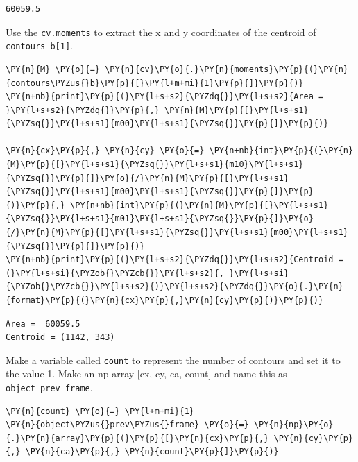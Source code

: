 \documentclass[a4paper,11pt]{article}%
\begin{document}
    \begin{Verbatim}[commandchars=\\\{\}]
60059.5
    \end{Verbatim}

    Use the \texttt{cv.moments} to extract the x and y coordinates of the
centroid of \texttt{contours\_b{[}1{]}}.

    \begin{tcolorbox}[breakable, size=fbox, boxrule=1pt, pad at break*=1mm,colback=cellbackground, colframe=cellborder]
\begin{Verbatim}[commandchars=\\\{\}]
\PY{n}{M} \PY{o}{=} \PY{n}{cv}\PY{o}{.}\PY{n}{moments}\PY{p}{(}\PY{n}{contours\PYZus{}b}\PY{p}{[}\PY{l+m+mi}{1}\PY{p}{]}\PY{p}{)}
\PY{n+nb}{print}\PY{p}{(}\PY{l+s+s2}{\PYZdq{}}\PY{l+s+s2}{Area = }\PY{l+s+s2}{\PYZdq{}}\PY{p}{,} \PY{n}{M}\PY{p}{[}\PY{l+s+s1}{\PYZsq{}}\PY{l+s+s1}{m00}\PY{l+s+s1}{\PYZsq{}}\PY{p}{]}\PY{p}{)}

\PY{n}{cx}\PY{p}{,} \PY{n}{cy} \PY{o}{=} \PY{n+nb}{int}\PY{p}{(}\PY{n}{M}\PY{p}{[}\PY{l+s+s1}{\PYZsq{}}\PY{l+s+s1}{m10}\PY{l+s+s1}{\PYZsq{}}\PY{p}{]}\PY{o}{/}\PY{n}{M}\PY{p}{[}\PY{l+s+s1}{\PYZsq{}}\PY{l+s+s1}{m00}\PY{l+s+s1}{\PYZsq{}}\PY{p}{]}\PY{p}{)}\PY{p}{,} \PY{n+nb}{int}\PY{p}{(}\PY{n}{M}\PY{p}{[}\PY{l+s+s1}{\PYZsq{}}\PY{l+s+s1}{m01}\PY{l+s+s1}{\PYZsq{}}\PY{p}{]}\PY{o}{/}\PY{n}{M}\PY{p}{[}\PY{l+s+s1}{\PYZsq{}}\PY{l+s+s1}{m00}\PY{l+s+s1}{\PYZsq{}}\PY{p}{]}\PY{p}{)}
\PY{n+nb}{print}\PY{p}{(}\PY{l+s+s2}{\PYZdq{}}\PY{l+s+s2}{Centroid = (}\PY{l+s+si}{\PYZob{}\PYZcb{}}\PY{l+s+s2}{, }\PY{l+s+si}{\PYZob{}\PYZcb{}}\PY{l+s+s2}{)}\PY{l+s+s2}{\PYZdq{}}\PY{o}{.}\PY{n}{format}\PY{p}{(}\PY{n}{cx}\PY{p}{,}\PY{n}{cy}\PY{p}{)}\PY{p}{)}
\end{Verbatim}
\end{tcolorbox}

    \begin{Verbatim}[commandchars=\\\{\}]
Area =  60059.5
Centroid = (1142, 343)
    \end{Verbatim}

    Make a variable called \texttt{count} to represent the number of
contours and set it to the value 1. Make an np array {[}cx, cy, ca,
count{]} and name this as \texttt{object\_prev\_frame}.

    \begin{tcolorbox}[breakable, size=fbox, boxrule=1pt, pad at break*=1mm,colback=cellbackground, colframe=cellborder]
\begin{Verbatim}[commandchars=\\\{\}]
\PY{n}{count} \PY{o}{=} \PY{l+m+mi}{1}
\PY{n}{object\PYZus{}prev\PYZus{}frame} \PY{o}{=} \PY{n}{np}\PY{o}{.}\PY{n}{array}\PY{p}{(}\PY{p}{[}\PY{n}{cx}\PY{p}{,} \PY{n}{cy}\PY{p}{,} \PY{n}{ca}\PY{p}{,} \PY{n}{count}\PY{p}{]}\PY{p}{)}
\end{Verbatim}
\end{tcolorbox}
\end{document}
